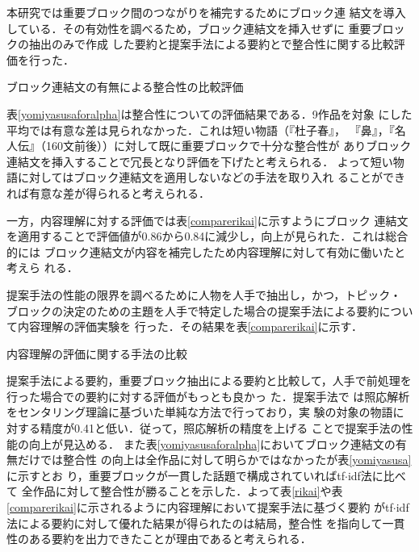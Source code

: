 \documentclass[japanese]{jnlp_1.4}
\begin{document}
 
 本研究では重要ブロック間のつながりを補完するためにブロック連
 結文を導入している．その有効性を調べるため，ブロック連結文を挿入せずに
 重要ブロックの抽出のみで作成
 した要約と提案手法による要約とで整合性に関する比較評価を行った．

 \begin{table}[b]
   \caption{ブロック連結文の有無による整合性の比較評価} \label{yomiyasusaforalpha}
  \begin{center}

  \end{center}
 \end{table}

 表\ref{yomiyasusaforalpha}は整合性についての評価結果である．9作品を対象
 にした平均では有意な差は見られなかった．これは短い物語（『杜子春』，
 『鼻』，『名人伝』（160文前後））に対して既に重要ブロックで十分な整合性が
 ありブロック連結文を挿入することで冗長となり評価を下げたと考えられる．
 よって短い物語に対してはブロック連結文を適用しないなどの手法を取り入れ
 ることができれば有意な差が得られると考えられる．

 一方，内容理解に対する評価では表\ref{comparerikai}に示すようにブロック
 連結文を適用することで評価値が0.86から0.84に減少し，向上が見られた．これは総合的には
 ブロック連結文が内容を補完したため内容理解に対して有効に働いたと考えら
 れる．
 
 提案手法の性能の限界を調べるために人物を人手で抽出し，かつ，トピック・
 ブロックの決定のための主題を人手で特定した場合の提案手法による要約について内容理解の評価実験を
 行った．その結果を表\ref{comparerikai}に示す．

 \begin{table}[t]
   \caption{内容理解の評価に関する手法の比較}\label{comparerikai}
  \begin{center}

  \end{center}
 \end{table}

 提案手法による要約，重要ブロック抽出による要約と比較して，人手で前処理を行った場合での要約に対する評価がもっとも良かっ
 た．提案手法で
 は照応解析をセンタリング理論に基づいた単純な方法で行っており，実
 験の対象の物語に対する精度が0.41と低い．従って，照応解析の精度を上げる
 ことで提案手法の性能の向上が見込める．
また表\ref{yomiyasusaforalpha}においてブロック連結文の有無だけでは整合性
 の向上は全作品に対して明らかではなかったが表\ref{yomiyasusa}に示すとお
 り，重要ブロックが一貫した話題で構成されていればtf$\cdot$idf法に比べて
 全作品に対して整合性が勝ることを示した．よって表\ref{rikai}や表
 \ref{comparerikai}に示されるように内容理解において提案手法に基づく要約
 がtf$\cdot$idf法による要約に対して優れた結果が得られたのは結局，整合性
 を指向して一貫性のある要約を出力できたことが理由であると考えられる．
\end{document}
